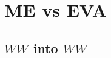 \documentclass[a4paper,11pt]{article}
\begin{document}


\section{ME vs EVA}

\subsection{$WW$ into $WW$}





\end{document}
